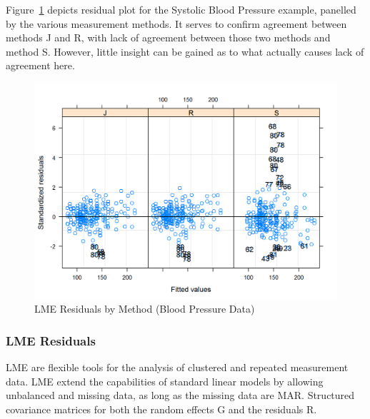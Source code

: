 \documentclass[12pt, a4paper]{report}
\theoremstyle{definition}
\theoremstyle{remark}
\begin{document}
Figure~\ref{bloodnlme-ResidPlot} depicts residual plot for the Systolic Blood Pressure example, panelled by the various measurement methods. It serves to confirm agreement between methods J and R, with lack of agreement between those two methods and method S. However, little insight can be gained as to what actually causes lack of agreement here. 
\begin{figure}[h!]
	\centering
	\includegraphics[width=0.8\linewidth]{images/bloodnlme-ResidPlot}
	\caption{LME Residuals by Method (Blood Pressure Data)}
	\label{bloodnlme-ResidPlot}
\end{figure}





%


\subsubsection{LME Residuals}
LME are flexible tools for the analysis of clustered and repeated measurement data. LME extend the capabilities of standard linear models by allowing unbalanced and missing data, as long as the missing data are MAR. Structured covariance matrices for both the random effects G and the residuals R. 
\end{document}
